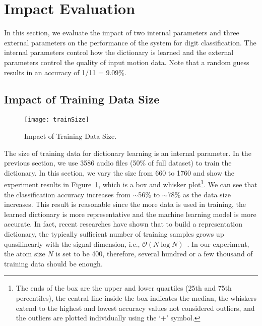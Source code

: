 \section{Impact Evaluation}\label{sec:impact}
In this section, we evaluate the impact of two internal parameters and three external parameters on the performance of the {\systemName} system for digit classification. 
The internal parameters control how the dictionary is learned and the external parameters control the quality of input motion data. 
Note that a random guess results in an accuracy of 1/11 = 9.09\%.

\subsection{Impact of Training Data Size}\label{sec:impact:trainsize}
\begin{figure}[h]
	\centering
	\texttt{[image: trainSize]}
	\vspace{-.1in}
	\caption{Impact of Training Data Size.}
	\label{fig:trainSize}
	\vspace{-.1in}
\end{figure}

The size of training data for dictionary learning is an internal parameter. In the previous section, we use 3586 audio files (50\% of full dataset) to train the dictionary. In this section, we vary the size from 660 to 1760 and show the experiment results in Figure~\ref{fig:trainSize}, which is a box and whisker plot\footnote{The ends of the box are the upper and lower quartiles (25th and 75th percentiles), the central line inside the box indicates the median, the whiskers extend to the highest and lowest accuracy values not considered outliers, and the outliers are plotted individually using the `+' symbol.}. 
We can see that the classification accuracy increases from $\sim$56\% to $\sim$78\% as the data size increases. This result is reasonable since the more data is used in training, the learned dictionary is more representative and the machine learning model is more accurate. 
%
In fact, recent researches have shown that to build a representation dictionary, the typically sufficient number of training samples grows up quasilinearly with the signal dimension, i.e., $\mathcal{O}(N\log N)$~\cite{remi2010dictionary}. In our experiment, the atom size $N$ is set to be 400, therefore, several hundred or a few thousand of training data should be enough.




